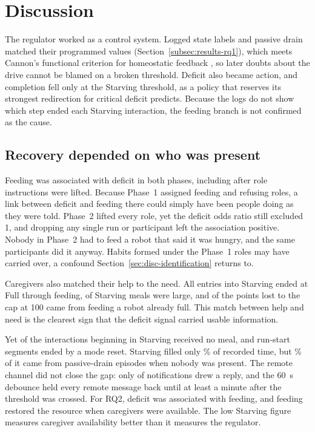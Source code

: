 \chapter{Discussion}
\label{chap:discussion}

The regulator worked as a control system. Logged state labels and passive drain matched their programmed values (Section~\ref{subsec:results-rq1}), which meets Cannon's functional criterion for homeostatic feedback \citep{Cannon1929Homeostasis}, so later doubts about the drive cannot be blamed on a broken threshold. Deficit also became action, and completion fell only at the Starving threshold, as a policy that reserves its strongest redirection for critical deficit predicts. Because the logs do not show which step ended each Starving interaction, the feeding branch is not confirmed as the cause.

\section{Recovery depended on who was present}
\label{sec:disc-recovery}

Feeding was associated with deficit in both phases, including after role instructions were lifted. Because Phase~1 assigned feeding and refusing roles, a link between deficit and feeding there could simply have been people doing as they were told. Phase~2 lifted every role, yet the deficit odds ratio still excluded 1, and dropping any single run or participant left the association positive. Nobody in Phase~2 had to feed a robot that said it was hungry, and the same participants did it anyway. Habits formed under the Phase~1 roles may have carried over, a confound Section~\ref{sec:disc-identification} returns to.

Caregivers also matched their help to the need. All \CoreDepletionEpisodes{} entries into Starving ended at Full through feeding, \CoreStarvingLargeMeals{} of \CoreStarvingMeals{} Starving meals were large, and \CoreClippedPointsFull{} of the \CoreClippedPoints{} points lost to the cap at 100 came from feeding a robot already full. This match between help and need is the clearest sign that the deficit signal carried usable information.

Yet \CoreStarvingOnsetUnfed{} of the \CoreStarvingInteractions{} interactions beginning in Starving received no meal, and \CorePTwoStartupModeResets{} run-start segments ended by a mode reset. Starving filled only \CoreStarvingPercent{}\% of recorded time, but \CorePassiveStarvingShare{}\% of it came from \CorePassiveDrainEpisodes{} passive-drain episodes when nobody was present. The remote channel did not close the gap: only \CoreTelegramMessages{} of \CoreTelegramPings{} notifications drew a reply, and the 60~s debounce held every remote message back until at least a minute after the threshold was crossed. For RQ2, deficit was associated with feeding, and feeding restored the resource when caregivers were available. The low Starving figure measures caregiver availability better than it measures the regulator.


